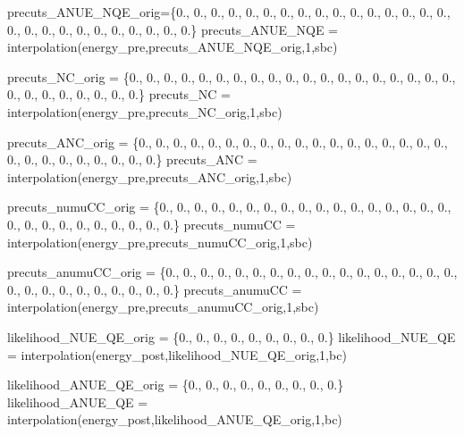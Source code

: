 precuts\+\_\+\+A\+N\+U\+E\+\_\+\+N\+Q\+E\+\_\+orig=\{0., 0., 0., 0., 0., 0., 0., 0., 0., 0., 0., 0., 0., 0., 0., 0., 0., 0., 0., 0., 0., 0., 0., 0., 0., 0., 0.\} precuts\+\_\+\+A\+N\+U\+E\+\_\+\+N\+QE = interpolation(energy\+\_\+pre,precuts\+\_\+\+A\+N\+U\+E\+\_\+\+N\+Q\+E\+\_\+orig,1,sbc)

precuts\+\_\+\+N\+C\+\_\+orig = \{0., 0., 0., 0., 0., 0., 0., 0., 0., 0., 0., 0., 0., 0., 0., 0., 0., 0., 0., 0., 0., 0., 0., 0., 0., 0., 0.\} precuts\+\_\+\+NC = interpolation(energy\+\_\+pre,precuts\+\_\+\+N\+C\+\_\+orig,1,sbc)

precuts\+\_\+\+A\+N\+C\+\_\+orig = \{0., 0., 0., 0., 0., 0., 0., 0., 0., 0., 0., 0., 0., 0., 0., 0., 0., 0., 0., 0., 0., 0., 0., 0., 0., 0., 0.\} precuts\+\_\+\+A\+NC = interpolation(energy\+\_\+pre,precuts\+\_\+\+A\+N\+C\+\_\+orig,1,sbc)

precuts\+\_\+numu\+C\+C\+\_\+orig = \{0., 0., 0., 0., 0., 0., 0., 0., 0., 0., 0., 0., 0., 0., 0., 0., 0., 0., 0., 0., 0., 0., 0., 0., 0., 0., 0.\} precuts\+\_\+numu\+CC = interpolation(energy\+\_\+pre,precuts\+\_\+numu\+C\+C\+\_\+orig,1,sbc)

precuts\+\_\+anumu\+C\+C\+\_\+orig = \{0., 0., 0., 0., 0., 0., 0., 0., 0., 0., 0., 0., 0., 0., 0., 0., 0., 0., 0., 0., 0., 0., 0., 0., 0., 0., 0.\} precuts\+\_\+anumu\+CC = interpolation(energy\+\_\+pre,precuts\+\_\+anumu\+C\+C\+\_\+orig,1,sbc)

likelihood\+\_\+\+N\+U\+E\+\_\+\+Q\+E\+\_\+orig = \{0., 0., 0., 0., 0., 0., 0., 0., 0.\} likelihood\+\_\+\+N\+U\+E\+\_\+\+QE = interpolation(energy\+\_\+post,likelihood\+\_\+\+N\+U\+E\+\_\+\+Q\+E\+\_\+orig,1,bc)

likelihood\+\_\+\+A\+N\+U\+E\+\_\+\+Q\+E\+\_\+orig = \{0., 0., 0., 0., 0., 0., 0., 0., 0.\} likelihood\+\_\+\+A\+N\+U\+E\+\_\+\+QE = interpolation(energy\+\_\+post,likelihood\+\_\+\+A\+N\+U\+E\+\_\+\+Q\+E\+\_\+orig,1,bc)

